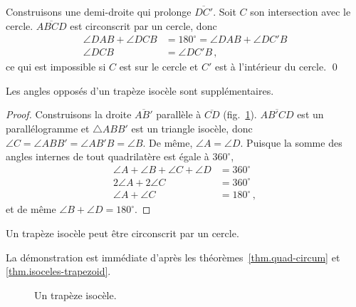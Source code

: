Construisons une demi-droite qui prolonge $\overline{DC'}$. Soit $C$ son intersection avec le cercle. $\overline{ABCD}$ est circonscrit par un cercle, donc 
\begin{align*}
\angle DAB + \angle DCB &=  180^\circ = \angle DAB + \angle DC'B\\
\angle DCB &= \angle DC'B\,,
\end{align*}
ce qui est impossible si $C$ est sur le cercle et $C'$ est à l'intérieur du cercle. \qed

\begin{theorem}\label{thm.isoceles-trapezoid}
Les angles opposés d'un trapèze isocèle sont supplémentaires.
\end{theorem}
\begin{proof}
Construisons la droite $\overline{AB'}$ parallèle à $\overline{CD}$ (fig.~\ref{f.trap-3}). $\overline{AB'CD}$ est un parallélogramme et  $\triangle ABB'$ est un triangle isocèle, donc $\angle C= \angle ABB' = \angle AB'B = \angle B$. De même, $\angle A = \angle D$. Puisque la somme des angles internes de tout quadrilatère est égale à $360^\circ$,
\begin{align*}
\angle A + \angle B + \angle C + \angle D &= 360^\circ\\
2\angle A + 2 \angle C &= 360^\circ\\
\angle A +  \angle C &= 180^\circ\,,
\end{align*}
et de même $\angle B +  \angle D = 180^\circ$.
\end{proof}

\begin{theorem}
Un trapèze isocèle peut être circonscrit par un cercle.
\end{theorem}
La démonstration est immédiate d'après les théorèmes~\ref{thm.quad-circum} et  \ref{thm.isoceles-trapezoid}.

\begin{figure}[htbp]
\centering

\caption{Un trapèze isocèle.}\label{f.trap-3}
\end{figure}

